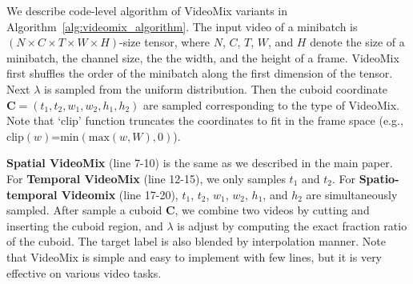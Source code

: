 We describe code-level algorithm of VideoMix variants in Algorithm~\ref{alg:videomix_algorithm}.
The input video of a minibatch is $(N\times C \times T \times W \times H)$-size tensor, where $N$, $C$, $T$, $W$, and $H$ denote the size of a minibatch, the channel size, the the width, and the height of a frame.
VideoMix first shuffles the order of the minibatch along the first dimension of the tensor. 
Next $\lambda$ is sampled from the uniform distribution.
Then the cuboid coordinate $\mathbf{C}=(t_1,t_2,w_1,w_2,h_1,h_2)$ are sampled corresponding to the type of VideoMix. 
Note that `clip' function truncates the coordinates to fit in the frame space (e.g., $\text{clip}(w)$=$\text{min}(\text{max}(w,W),0)$). 

\textbf{Spatial VideoMix} ({line 7-10}) is the same as we described in the main paper. 
For \textbf{Temporal VideoMix} (line 12-15), we only samples $t_1$ and $t_2$.
For \textbf{Spatio-temporal Videomix} (line 17-20), $t_1$, $t_2$, $w_1$, $w_2$, $h_1$, and $h_2$ are simultaneously sampled. 
After sample a cuboid $\mathbf{C}$, we combine two videos by cutting and inserting the cuboid region, and $\lambda$ is adjust by computing the exact fraction ratio of the cuboid. 
The target label is also blended by interpolation manner. 
Note that VideoMix is simple and easy to implement with few lines, but it is very effective on various video tasks.

